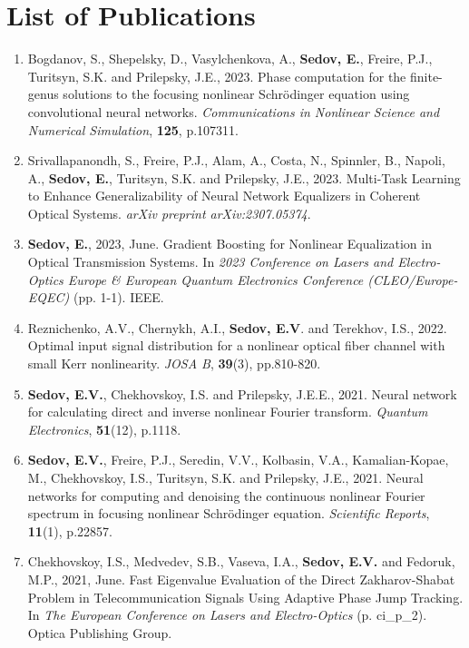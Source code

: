 \chapter*{List of Publications}

\begin{enumerate}
    \item Bogdanov, S., Shepelsky, D., Vasylchenkova, A., \textbf{Sedov, E.}, Freire, P.J., 
    Turitsyn, S.K. and Prilepsky, J.E., 2023. Phase computation for the 
    finite-genus solutions to the focusing nonlinear Schrödinger equation 
    using convolutional neural networks. \textit{Communications in Nonlinear Science and Numerical Simulation}, \textbf{125}, p.107311.
    \item Srivallapanondh, S., Freire, P.J., Alam, A., Costa, N., Spinnler, B., 
    Napoli, A., \textbf{Sedov, E.}, Turitsyn, S.K. and Prilepsky, J.E., 2023. 
    Multi-Task Learning to Enhance Generalizability of Neural Network 
    Equalizers in Coherent Optical Systems. \textit{arXiv preprint arXiv:2307.05374}.
    \item \textbf{Sedov, E.}, 2023, June. Gradient Boosting for Nonlinear Equalization in Optical Transmission Systems. In \textit{2023 Conference on Lasers and Electro-Optics Europe \& European Quantum Electronics Conference (CLEO/Europe-EQEC)} (pp. 1-1). IEEE.
    \item Reznichenko, A.V., Chernykh, A.I., \textbf{Sedov, E.V}. and Terekhov, I.S., 2022.
    Optimal input signal distribution for a nonlinear optical fiber channel
    with small Kerr nonlinearity. \textit{JOSA B}, \textbf{39}(3), pp.810-820.
    \item \textbf{Sedov, E.V.}, Chekhovskoy, I.S. and Prilepsky, J.E.E., 2021. Neural 
    network for calculating direct and inverse nonlinear Fourier transform. \textit{Quantum Electronics}, \textbf{51}(12), p.1118.
    \item \textbf{Sedov, E.V.}, Freire, P.J., Seredin, V.V., Kolbasin, V.A., 
    Kamalian-Kopae, M., Chekhovskoy, I.S., Turitsyn, S.K. and Prilepsky, 
    J.E., 2021. Neural networks for computing and denoising the continuous 
    nonlinear Fourier spectrum in focusing nonlinear Schrödinger equation. \textit{Scientific Reports}, \textbf{11}(1), p.22857.
    \item Chekhovskoy, I.S., Medvedev, S.B., Vaseva, I.A., \textbf{Sedov, E.V.} and 
    Fedoruk, M.P., 2021, June. Fast Eigenvalue Evaluation of the Direct 
    Zakharov-Shabat Problem in Telecommunication Signals Using Adaptive 
    Phase Jump Tracking. In \textit{The European Conference on Lasers and Electro-Optics} (p. ci\_p\_2). Optica Publishing Group.

\end{enumerate}
